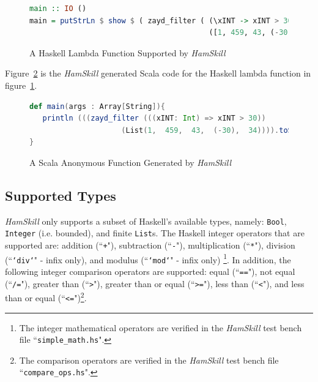 \documentclass{report}
\begin{document}
\begin{figure}[H]
\begin{mdframed}
\begin{lstlisting}[language=Haskell, basicstyle=\scriptsize]
main :: IO ()
main = putStrLn $ show $ ( zayd_filter ( (\xINT -> xINT > 30) ) 
                                         ([1, 459, 43, (-30), 34]) )
\end{lstlisting}
\end{mdframed}
\caption{A Haskell Lambda Function Supported by \textit{HamSkill}}\label{fig:haskellLambdaFunction}
\end{figure}

Figure~\ref{fig:scalaLambdaFunction} is the \textit{HamSkill} generated Scala code for the Haskell lambda function in figure~\ref{fig:haskellLambdaFunction}.

\begin{figure}[H]
\begin{mdframed}
\begin{lstlisting}[language=Scala, basicstyle=\scriptsize]
def main(args : Array[String]){
   println (((zayd_filter (((xINT: Int) => xINT > 30)) 
                     (List(1,  459,  43,  (-30),  34)))).toString())
} 
\end{lstlisting}
\end{mdframed}
\caption{A Scala Anonymous Function Generated by \textit{HamSkill}}\label{fig:scalaLambdaFunction}
\end{figure}

\subsection{Supported Types}\label{sec:supportedTypes}

\emph{HamSkill} only supports a subset of Haskell's available types, namely: \texttt{Bool}, \texttt{\tt Integer} (i.e. bounded), and finite \texttt{List}s.  The Haskell integer operators that are supported are: addition (``\texttt{+}"), subtraction (``\texttt{-}"), multiplication (``\texttt{*}"), division (``\texttt{`div`}" - infix only), and modulus (``\texttt{`mod`}" - infix only) \footnote{The integer mathematical operators are verified in the \textit{HamSkill} test bench file ``\texttt{simple\_math.hs}".}.  In addition, the following integer comparison operators are supported: equal (``\texttt{==}"), not equal (``\texttt{/=}"), greater than (``\texttt{>}"), greater than or equal (``\texttt{>=}"), less than (``\texttt{<}"), and less than or equal (``\texttt{<=}")\footnote{The comparison operators are verified in the \textit{HamSkill} test bench file ``\texttt{compare\_ops.hs}".}.
\end{document}
